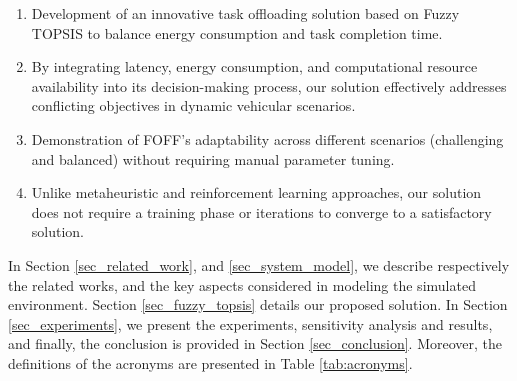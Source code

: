 \documentclass[iicol]{sn-jnl}
\begin{document}
\begin{enumerate}
    \item Development of an innovative task offloading solution based on Fuzzy TOPSIS to balance energy consumption and task completion time.
    \item By integrating latency, energy consumption, and computational resource availability into its decision-making process, our solution effectively addresses conflicting objectives in dynamic vehicular scenarios.
   \item Demonstration of FOFF's adaptability across different scenarios (challenging and balanced) without requiring manual parameter tuning.
   \item Unlike metaheuristic and reinforcement learning approaches, our solution does not require a training phase or iterations to converge to a satisfactory solution.
\end{enumerate}

In Section \ref{sec_related_work},  and \ref{sec_system_model}, we describe respectively the related works, and the key aspects considered in modeling the simulated environment. Section \ref{sec_fuzzy_topsis} details our proposed solution. In Section \ref{sec_experiments}, we present the experiments, sensitivity analysis and results, and finally, the conclusion is provided in Section \ref{sec_conclusion}. Moreover, the definitions of the acronyms are presented in Table \ref{tab:acronyms}.
\end{document}
